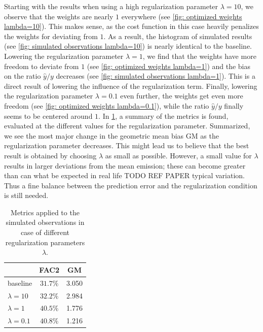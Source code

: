 \documentclass{article}
\begin{document}
Starting with the results when using a high regularization parameter $\lambda=10$, we observe that the weights are nearly $1$ everywhere (see \cref{fig: optimized weights lambda=10}). This makes sense, as the cost function in this case heavily penalizes the weights for deviating from $1$. As a result, the histogram of simulated results (see \cref{fig: simulated observations lambda=10}) is nearly identical to the baseline. Lowering the regularization parameter $\lambda=1$, we find that the weights have more freedom to deviate from $1$ (see \cref{fig: optimized weights lambda=1}) and the bias on the ratio $\hat{y}/y$ decreases (see \cref{fig: simulated observations lambda=1}). This is a direct result of lowering the influence of the regularization term. Finally, lowering the regularization parameter $\lambda=0.1$ even further, the weights get even more freedom (see \cref{fig: optimized weights lambda=0.1}), while the ratio $\hat{y}/y$ finally seems to be centered around $1$. In \cref{table: evaluated metrics}, a summary of the metrics is found, evaluated at the different values for the regularization parameter. Summarized, we see the most major change in the geometric mean bias GM as the regularization parameter decreases. This might lead us to believe that the best result is obtained by choosing $\lambda$ as small as possible. However, a small value for $\lambda$ results in larger deviations from the mean emission; these can become greater than can what be expected in real life TODO REF PAPER typical variation. Thus a fine balance between the prediction error and the regularization condition is still needed.\\

\begin{table}
	\centering
	\caption{Metrics applied to the simulated observations in case of different regularization parameters $\lambda$.}\label{table: evaluated metrics}
\begin{tabular}{|l||c|c|}
	\hline
	&FAC2&GM\\\hline
	baseline&$31.7\%$&3.050\\\hline
	$\lambda=10$&$32.2\%$&2.984\\\hline	
	$\lambda=1$&$40.5\%$&1.776\\\hline	
	$\lambda=0.1$&$40.8\%$&1.216\\\hline
\end{tabular}
\end{table}
\end{document}
